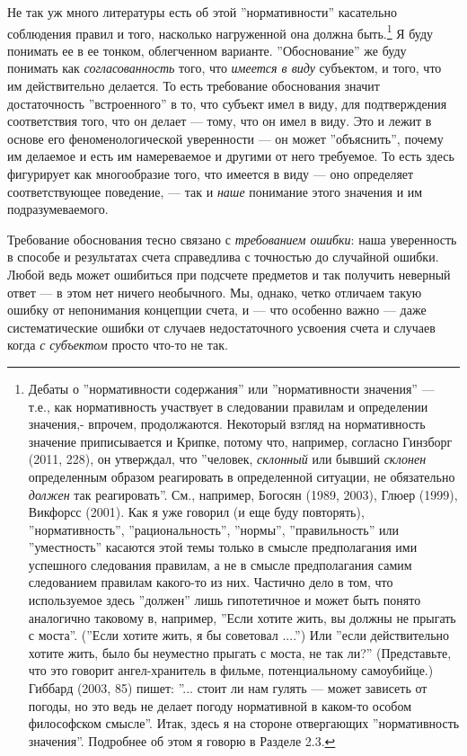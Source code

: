\documentclass[11pt]{book}
\begin{document}
Не так уж много литературы есть об этой ''нормативности'' касательно соблюдения правил и того, насколько нагруженной она должна быть.\footnote{Дебаты о ''нормативности содержания'' или ''нормативности значения'' --- т.е., как нормативность участвует в следовании правилам и определении значения,- впрочем, продолжаются. Некоторый взгляд на нормативность значение приписывается и Крипке, потому что, например, согласно Гинзборг (2011, 228), он утверждал, что ''человек, \textit{склонный} или бывший \textit{склонен} определенным образом реагировать в определенной ситуации, не обязательно \textit{должен} так реагировать''. См., например, Богосян (1989, 2003), Глюер (1999), Викфорсс (2001). Как я уже говорил (и еще буду повторять), ''нормативность'', ''рациональность'', ''нормы'', ''правильность'' или ''уместность'' касаются этой темы только в смысле предполагания ими успешного следования правилам, а не в смысле предполагания самим следованием правилам какого-то из них. Частично дело в том, что используемое здесь ''должен'' лишь гипотетичное и может быть понято аналогично таковому в, например, ''Если хотите жить, вы должны не прыгать с моста''. (''Если хотите жить, я бы советовал ....'') Или ''если действительно хотите жить, было бы неуместно прыгать с моста, не так ли?'' (Представьте, что это говорит ангел-хранитель в фильме, потенциальному самоубийце.) Гиббард (2003, 85) пишет: ''... стоит ли нам гулять --- может зависеть от погоды, но это ведь не делает погоду нормативной в каком-то особом философском смысле''. Итак, здесь я на стороне отвергающих ''нормативность значения''. Подробнее об этом я говорю в Разделе 2.3.} Я буду понимать ее в ее тонком, облегченном варианте. ''Обоснование'' же буду понимать как \textit{согласованность} того, что \textit{имеется в виду} субъектом, и того, что им действительно делается. То есть требование обоснования значит достаточность ''встроенного'' в то, что субъект имел в виду, для подтверждения соответствия того, что он делает --- тому, что он имел в виду. Это и лежит в основе его феноменологической уверенности --- он может ''объяснить'', почему им делаемое и есть им намереваемое и другими от него требуемое. То есть здесь фигурирует как многообразие того, что имеется в виду --- оно определяет соответствующее поведение, --- так и \textit{наше} понимание этого значения и им подразумеваемого.

Требование обоснования тесно связано с \textit{требованием ошибки}: наша уверенность в способе и результатах счета справедлива с точностью до случайной ошибки. Любой ведь может ошибиться при подсчете предметов и так получить неверный ответ --- в этом нет ничего необычного. Мы, однако, четко отличаем такую ошибку от непонимания концепции счета, и --- что особенно важно --- даже систематические ошибки от случаев недостаточного усвоения счета и случаев когда \textit{с субъектом} просто что-то не так.
\end{document}
